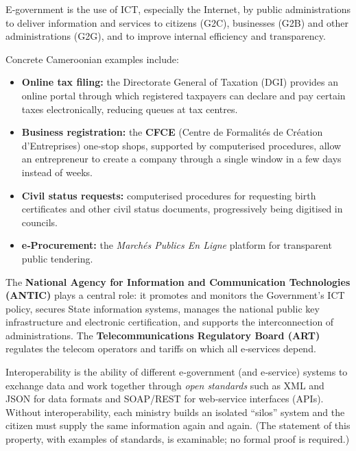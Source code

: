 \documentclass[11pt]{article}
\newcommand{\cle}[1]{{\popxbold\color{popdark}#1}}
\begin{document}
\begin{definition}[E‑government]
\cle{E‑government} is the use of ICT, especially the Internet, by public administrations to deliver information and services to citizens (G2C), businesses (G2B) and other administrations (G2G), and to improve internal efficiency and transparency.
\end{definition}

Concrete Cameroonian examples include:

\begin{itemize}
\item \textbf{Online tax filing:} the Directorate General of Taxation (DGI) provides an online portal through which registered taxpayers can declare and pay certain taxes electronically, reducing queues at tax centres.
\item \textbf{Business registration:} the \textbf{CFCE} (Centre de Formalités de Création d'Entreprises) one‑stop shops, supported by computerised procedures, allow an entrepreneur to create a company through a single window in a few days instead of weeks.
\item \textbf{Civil status requests:} computerised procedures for requesting birth certificates and other civil status documents, progressively being digitised in councils.
\item \textbf{e‑Procurement:} the \emph{Marchés Publics En Ligne} platform for transparent public tendering.
\end{itemize}

The \textbf{National Agency for Information and Communication Technologies (\cle{ANTIC})} plays a central role: it promotes and monitors the Government's ICT policy, secures State information systems, manages the national public key infrastructure and electronic certification, and supports the interconnection of administrations. The \textbf{Telecommunications Regulatory Board (\cle{ART})} regulates the telecom operators and tariffs on which all e‑services depend.

\begin{propriete}[Interoperability]
\cle{Interoperability} is the ability of different e‑government (and e‑service) systems to exchange data and work together through \emph{open standards} such as XML and JSON for data formats and SOAP/REST for web‑service interfaces (APIs). Without interoperability, each ministry builds an isolated ``silos'' system and the citizen must supply the same information again and again. (The statement of this property, with examples of standards, is examinable; no formal proof is required.)
\end{propriete}
\end{document}
